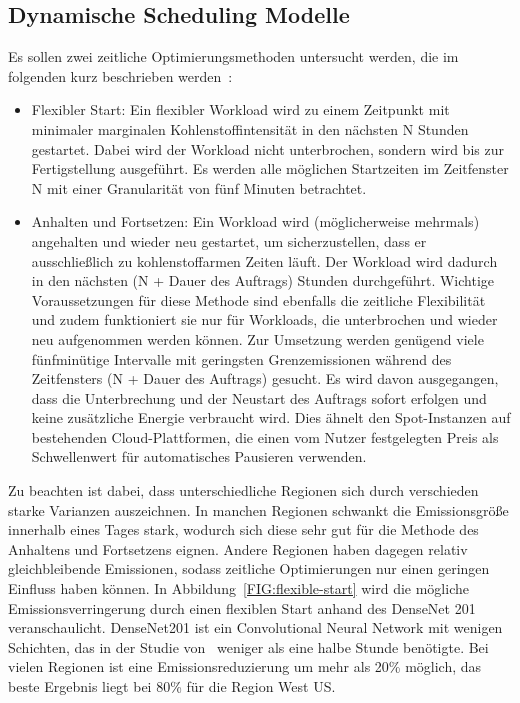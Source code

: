 \subsection{Dynamische Scheduling Modelle}
Es sollen zwei zeitliche Optimierungsmethoden untersucht werden, die im folgenden kurz beschrieben werden~\cite{Dodge.06212022}:
\begin{itemize}
 \item Flexibler Start: Ein flexibler Workload wird zu einem Zeitpunkt mit minimaler marginalen Kohlenstoffintensität in den nächsten N Stunden gestartet.
 Dabei wird der Workload nicht unterbrochen, sondern wird bis zur Fertigstellung ausgeführt.
 Es werden alle möglichen Startzeiten im Zeitfenster N mit einer Granularität von fünf Minuten betrachtet.
 \item Anhalten und Fortsetzen: Ein Workload wird (möglicherweise mehrmals) angehalten und wieder neu gestartet, um sicherzustellen, dass er ausschließlich zu kohlenstoffarmen Zeiten läuft.
 Der Workload wird dadurch in den nächsten (N + Dauer des Auftrags) Stunden durchgeführt.
 Wichtige Voraussetzungen für diese Methode sind ebenfalls die zeitliche Flexibilität und zudem funktioniert sie nur für Workloads, die unterbrochen und wieder neu aufgenommen werden können.
 Zur Umsetzung werden genügend viele fünfminütige Intervalle mit geringsten Grenzemissionen während des Zeitfensters (N + Dauer des Auftrags) gesucht.
 Es wird davon ausgegangen, dass die Unterbrechung und der Neustart des Auftrags sofort erfolgen und keine zusätzliche Energie verbraucht wird.
 Dies ähnelt den Spot-Instanzen auf bestehenden Cloud-Plattformen, die einen vom Nutzer festgelegten Preis als Schwellenwert für automatisches Pausieren verwenden.
\end {itemize}
Zu beachten ist dabei, dass unterschiedliche Regionen sich durch verschieden starke Varianzen auszeichnen.
In manchen Regionen schwankt die Emissionsgröße innerhalb eines Tages stark, wodurch sich diese sehr gut für die Methode des Anhaltens und Fortsetzens eignen.
Andere Regionen haben dagegen relativ gleichbleibende Emissionen, sodass zeitliche Optimierungen nur einen geringen Einfluss haben können.
In Abbildung~\ref{FIG:flexible-start} wird die mögliche Emissionsverringerung durch einen flexiblen Start anhand des DenseNet 201 veranschaulicht.
DenseNet201 ist ein Convolutional Neural Network mit wenigen Schichten, das in der Studie von~\cite{Dodge.06212022} weniger als eine halbe Stunde benötigte.
Bei vielen Regionen ist eine Emissionsreduzierung um mehr als 20\% möglich, das beste Ergebnis liegt bei 80\% für die Region West US\@.
